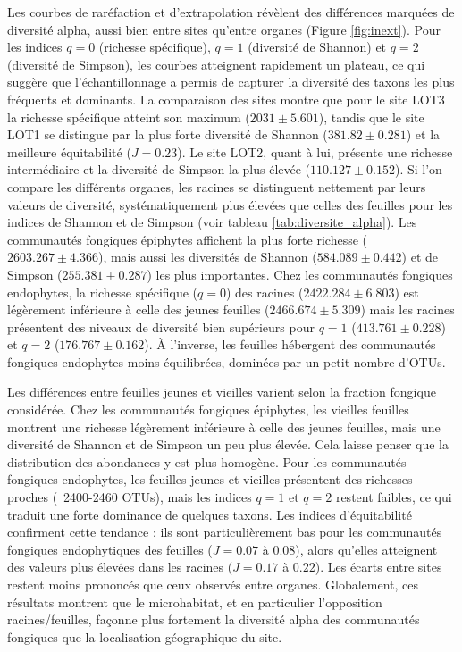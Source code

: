 \documentclass[a4paper,12pt]{article}
\begin{document}
Les courbes de raréfaction et d’extrapolation révèlent des différences marquées de diversité alpha, aussi bien entre sites qu’entre organes  (Figure \ref{fig:inext}). Pour les indices $q=0$ (richesse spécifique), $q=1$ (diversité de Shannon) et $q=2$ (diversité de Simpson), les courbes atteignent rapidement un plateau, ce qui suggère que l’échantillonnage a permis de capturer  la diversité des taxons les plus fréquents et dominants.
La comparaison des sites montre que pour le site LOT3 la richesse spécifique atteint son maximum ($2031\pm5.601$), tandis que le site LOT1 se distingue par la plus forte diversité de Shannon ($381.82 \pm 0.281$) et la meilleure équitabilité ($J=0.23$). Le  site LOT2, quant à lui, présente une richesse intermédiaire et la diversité de Simpson la plus élevée ($110.127 \pm 0.152$). 
Si l’on compare les différents organes, les racines se distinguent nettement par leurs valeurs de diversité, systématiquement plus élevées que celles des feuilles pour les indices de Shannon et de Simpson (voir tableau \ref{tab:diversite_alpha}). Les communautés fongiques épiphytes  affichent la plus forte richesse ($2603.267 \pm 4.366$), mais aussi les diversités de Shannon ($584.089 \pm 0.442$) et de Simpson ($255.381 \pm 0.287$) les plus importantes. Chez les communautés fongiques endophytes, la richesse spécifique ($q=0$) des racines ($2422.284 \pm 6.803$) est légèrement inférieure à celle des jeunes feuilles ($2466.674 \pm 5.309$) mais les racines présentent des niveaux de diversité bien supérieurs pour $q=1$ ($413.761 \pm 0.228$) et $q=2$ ($176.767 \pm 0.162$). À l’inverse, les feuilles hébergent des communautés fongiques endophytes moins équilibrées, dominées par un petit nombre d’OTUs.

Les différences entre feuilles jeunes et vieilles varient selon la fraction fongique considérée. Chez les communautés fongiques épiphytes, les vieilles feuilles montrent une richesse légèrement inférieure à celle des jeunes feuilles, mais une diversité de Shannon et de Simpson un peu plus élevée. Cela laisse penser que la distribution des abondances y est plus homogène. Pour les communautés fongiques endophytes, les feuilles jeunes et vieilles présentent des richesses proches (~2400-2460 OTUs), mais les indices $q=1$ et $q=2$ restent faibles, ce qui traduit une forte dominance de quelques taxons. Les indices d’équitabilité confirment cette tendance : ils sont particulièrement bas pour les communautés fongiques   endophytiques des feuilles ($J=0.07$ à $0.08$), alors qu’elles  atteignent des valeurs plus élevées dans les racines ($J=0.17$ à $0.22$).
Les écarts entre sites restent moins prononcés que ceux observés entre organes. Globalement, ces résultats montrent que le microhabitat, et en particulier l’opposition racines/feuilles, façonne plus fortement la diversité alpha des communautés fongiques que la localisation géographique du site.
\end{document}
